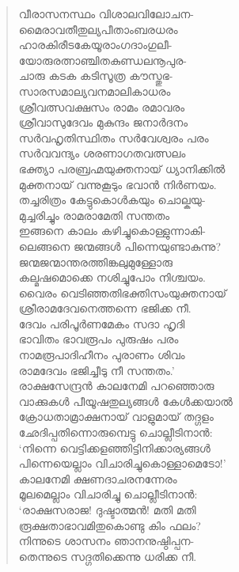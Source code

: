 \begin{verse}
വീരാസനസ്ഥം വിശാലവിലോചന-\\
മൈരാവതീതുല്യപീതാംബരധരം\\
ഹാരകിരീടകേയൂരാംഗദാംഗുലീ-\\
യോരുരത്നാഞ്ചിതകുണ്ഡലനൂപുര-\\
ചാരു കടക കടിസൂത്ര കൗസ്തുഭ-\\
സാരസമാല്യവനമാലികാധരം\\
ശ്രീവത്സവക്ഷസം രാമം രമാവരം\\
ശ്രീവാസുദേവം മുകുന്ദം ജനാര്‍ദനം\\
സര്‍വഹൃതിസ്ഥിതം സര്‍വേശ്വരം പരം\\
സര്‍വവന്ദ്യം ശരണാഗതവത്സലം\\
ഭക്ത്യാ പരബ്രഹ്മയുക്തനായ് ധ്യാനിക്കില്‍\\
മുക്തനായ് വന്നുകൂടും ഭവാന്‍ നിര്‍ണയം.\\
തച്ചരിത്രം കേട്ടുകൊള്‍കയും ചൊല്കയു-\\
മുച്ചരിച്ചും രാമരാമേതി സന്തതം\\
ഇങ്ങനെ കാലം കഴിച്ചുകൊള്ളുന്നാകി-\\
ലെങ്ങനെ ജന്മങ്ങള്‍ പിന്നെയുണ്ടാകുന്നു?\\
ജന്മജന്മാന്തരത്തിങ്കലുമുള്ളോരു\\
കല്മഷമൊക്കെ നശിച്ചുപോം നിശ്ചയം.\\
വൈരം വെടിഞ്ഞതിഭക്തിസംയുക്തനായ്\\
ശ്രീരാമദേവനെത്തന്നെ ഭജിക്ക നീ.\\
ദേവം പരിപൂര്‍ണമേകം സദാ ഹൃദി\\
ഭാവിതം ഭാവരൂപം പുരുഷം പരം\\
നാമരൂപാദിഹീനം പുരാണം ശിവം\\
രാമദേവം ഭജിച്ചീടു നീ സന്തതം.’\\
രാക്ഷസേന്ദ്രന്‍ കാലനേമി പറഞ്ഞൊരു\\
വാക്കുകള്‍ പീയൂഷതുല്യങ്ങള്‍ കേള്‍ക്കയാല്‍\\
ക്രോധതാമ്രാക്ഷനായ് വാളുമായ് തദ്ഗളം\\
ഛേദിപ്പതിന്നൊരുമ്പെട്ടു ചൊല്ലീടിനാന്‍:\\
‘നിന്നെ വെട്ടിക്കളഞ്ഞിട്ടിനിക്കാര്യങ്ങള്‍\\
പിന്നെയെല്ലാം വിചാരിച്ചുകൊള്ളാമെടോ!’\\
കാലനേമി ക്ഷണദാചരനന്നേരം\\
മൂലമെല്ലാം വിചാരിച്ചു ചൊല്ലീടിനാന്‍:\\
‘രാക്ഷസരാജ! ദുഷ്ടാത്മന്‍! മതി മതി\\
രൂക്ഷതാഭാവമിതുകൊണ്ടു കിം ഫലം?\\
നിന്നുടെ ശാസനം ഞാനനുഷ്ഠിപ്പന-\\
തെന്നുടെ സദ്ഗതിക്കെന്നു ധരിക്ക നീ.\\

\end{verse}
